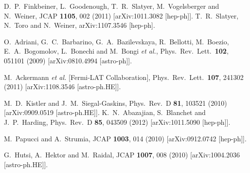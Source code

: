   D.~P.~Finkbeiner, L.~Goodenough, T.~R.~Slatyer, M.~Vogelsberger and N.~Weiner,
  JCAP {\bf 1105}, 002 (2011)
  [arXiv:1011.3082 [hep-ph]].
  T.~R.~Slatyer, N.~Toro and N.~Weiner,
  arXiv:1107.3546 [hep-ph].



  O.~Adriani, G.~C.~Barbarino, G.~A.~Bazilevskaya, R.~Bellotti, M.~Boezio, E.~A.~Bogomolov, L.~Bonechi and M.~Bongi {\it et al.},
  Phys.\ Rev.\ Lett.\  {\bf 102}, 051101 (2009)
  [arXiv:0810.4994 [astro-ph]].

  M.~Ackermann {\it et al.}  [Fermi-LAT Collaboration],
  Phys.\ Rev.\ Lett.\  {\bf 107}, 241302 (2011)
  [arXiv:1108.3546 [astro-ph.HE]].

  M.~D.~Kistler and J.~M.~Siegal-Gaskins,
  Phys.\ Rev.\ D {\bf 81}, 103521 (2010)
  [arXiv:0909.0519 [astro-ph.HE]].
  K.~N.~Abazajian, S.~Blanchet and J.~P.~Harding,
  Phys.\ Rev.\ D {\bf 85}, 043509 (2012)
  [arXiv:1011.5090 [hep-ph]].


  M.~Papucci and A.~Strumia,
  JCAP {\bf 1003}, 014 (2010)
  [arXiv:0912.0742 [hep-ph]].

  G.~Hutsi, A.~Hektor and M.~Raidal,
  JCAP {\bf 1007}, 008 (2010)
  [arXiv:1004.2036 [astro-ph.HE]].

